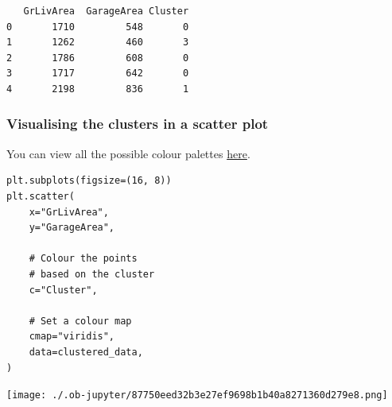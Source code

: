 \documentclass[11pt]{article}
\begin{document}
\label{org6ab8ff0}
\begin{verbatim}
   GrLivArea  GarageArea Cluster
0       1710         548       0
1       1262         460       3
2       1786         608       0
3       1717         642       0
4       2198         836       1
\end{verbatim}


 \newpage
\subsubsection{Visualising the clusters in a scatter plot}
\label{sec:org9334ebb}
You can view all the possible colour palettes \href{https://seaborn.pydata.org/tutorial/color\_palettes.html\#qualitative-color-palettes}{here}.
\begin{verbatim}
plt.subplots(figsize=(16, 8))
plt.scatter(
    x="GrLivArea",
    y="GarageArea",

    # Colour the points
    # based on the cluster
    c="Cluster",

    # Set a colour map
    cmap="viridis",
    data=clustered_data,
)
\end{verbatim}

\begin{center}
\texttt{[image: ./.ob-jupyter/87750eed32b3e27ef9698b1b40a8271360d279e8.png]}
\label{org9551c15}
\end{center}

 \newpage
\end{document}
